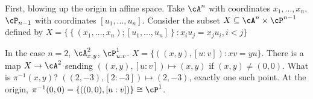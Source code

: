 First, blowing up the origin in affine space. Take $\cA^n$ with coordinates $x_1,\ldots,x_n$, $\cP_{n-1}$ with coordinates $[u_1,\ldots,u_n]$. Consider the subset $X \subseteq \cA^n \times \cP^{n-1}$ defined by $X=\{ \left\{(x_1,\ldots,x_n); [u_1,\ldots,u_n] \right\} \colon x_iu_j=x_ju_i, i<j\}$


In the case $n=2$, $\cA^2_{x,y}$, $\cP^1_{u:v}$. $X=\{ ((x,y),[u:v]) \colon xv=yu \}$. There is a map $X \to \cA^2$ sending $((x,y), [u:v]) \mapsto (x,y)$ if $(x,y) \neq (0,0)$. What is $\pi^{-1}(x,y)$? $((2,-3),[2 \colon -3]) \mapsto (2,-3)$, exactly one such point. At the origin, $\pi^{-1}(0,0)= \{ ((0,0), [u:v])\} \cong \cP^1$. 










































